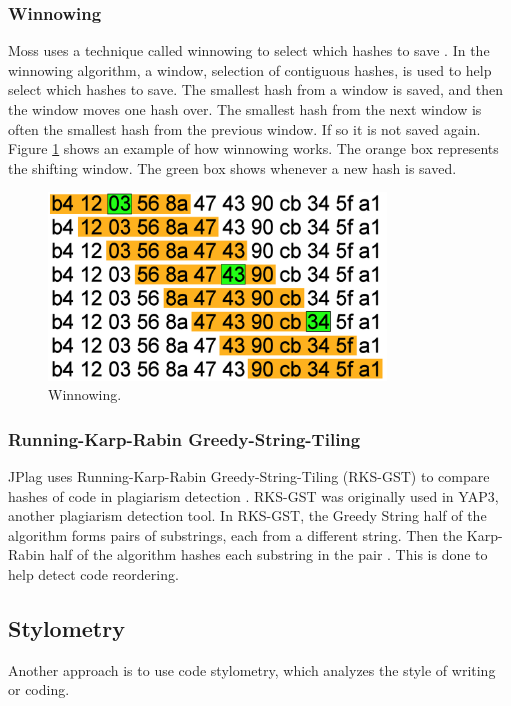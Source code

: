 \documentclass[10pt,journal,compsoc]{IEEEtran}
\begin{document}
			\subsubsection{Winnowing}
			Moss uses a technique called winnowing to select which hashes to save \cite{schleimer+wilkerson+aiken}. In the winnowing algorithm, a window, selection of contiguous hashes, is used to help select which hashes to save. The smallest hash from a window is saved, and then the window moves one hash over. The smallest hash from the next window is often the smallest hash from the previous window. If so it is not saved again. Figure \ref{fig:winnowing1} shows an example of how winnowing works. The orange box represents the shifting window. The green box shows whenever a new hash is saved.
		
			\begin{figure}[h!]
				\includegraphics[width=0.8\textwidth]{Winnowing.png}
				\caption{Winnowing.}
				\label{fig:winnowing1}
			\end{figure}
		
			\subsubsection{Running-Karp-Rabin Greedy-String-Tiling}
			JPlag uses Running-Karp-Rabin Greedy-String-Tiling (RKS-GST) to compare hashes of code in plagiarism detection \cite{prechelt+malpohl+philippsen}. RKS-GST was originally used in YAP3, another plagiarism detection tool. In RKS-GST, the Greedy String half of the algorithm forms pairs of substrings, each from a different string. Then the Karp-Rabin half of the algorithm hashes each substring in the pair \cite{wise}. This is done to help detect code reordering.
		
		\subsection{Stylometry}
		Another approach is to use code stylometry, which analyzes the style of writing or coding.
		
\end{document}
